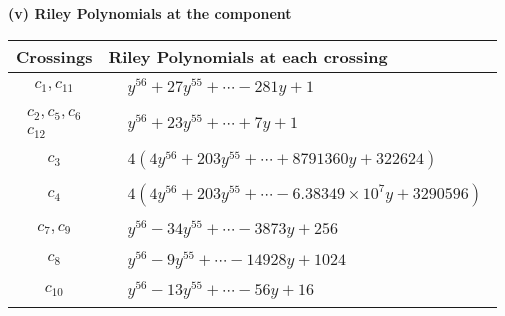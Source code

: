 \documentclass[1p]{elsarticle_modified}
\theoremstyle{definition}
\begin{document}
\newpage\renewcommand{\arraystretch}{1}
\flushleft \textbf{(v) Riley Polynomials at the component}\newline \\
\begin{tabular}{m{50pt}|m{274pt}}
Crossings & \hspace{64pt}Riley Polynomials at each crossing \\
\hline $$\begin{aligned}c_{1},c_{11}\end{aligned}$$&$\begin{aligned}
&y^{56}+27 y^{55}+\cdots-281 y+1
\end{aligned}$\\
\hline $$\begin{aligned}c_{2},c_{5},c_{6}\\c_{12}\end{aligned}$$&$\begin{aligned}
&y^{56}+23 y^{55}+\cdots+7 y+1
\end{aligned}$\\
\hline $$\begin{aligned}c_{3}\end{aligned}$$&$\begin{aligned}
&4(4 y^{56}+203 y^{55}+\cdots+8791360 y+322624)
\end{aligned}$\\
\hline $$\begin{aligned}c_{4}\end{aligned}$$&$\begin{aligned}
&4(4 y^{56}+203 y^{55}+\cdots-6.38349\times10^{7} y+3290596)
\end{aligned}$\\
\hline $$\begin{aligned}c_{7},c_{9}\end{aligned}$$&$\begin{aligned}
&y^{56}-34 y^{55}+\cdots-3873 y+256
\end{aligned}$\\
\hline $$\begin{aligned}c_{8}\end{aligned}$$&$\begin{aligned}
&y^{56}-9 y^{55}+\cdots-14928 y+1024
\end{aligned}$\\
\hline $$\begin{aligned}c_{10}\end{aligned}$$&$\begin{aligned}
&y^{56}-13 y^{55}+\cdots-56 y+16
\end{aligned}$\\
\hline
\end{tabular}\\~\\
\end{document}
